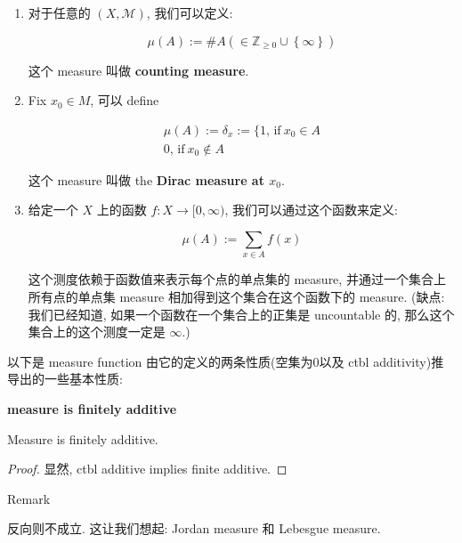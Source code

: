\documentclass{qlnotes-export}
\begin{document}
\begin{example}

\begin{enumerate}
\item
  对于任意的 \((X,\mathcal{M})\), 我们可以定义:

  \[\mu(A) := \# A( \in {\mathbb{Z}}_{\geq 0} \cup \left\{ \infty \right\})\]

  这个 measure 叫做 \textbf{counting measure}.
\item
  Fix \(x_{0} \in M\), 可以 define

  \[\begin{matrix}
  {\mu(A) := \delta_{x} := \{ 1\text{, if}\ x_{0} \in A} \\
  {0\text{, if}\ x_{0} \notin A}
  \end{matrix}\]

  这个 measure 叫做 the \textbf{Dirac measure at \(x_{0}\)}.
\item
  给定一个 \(X\) 上的函数 \(f:X\rightarrow\lbrack 0,\infty)\), 我们可以通过这个函数来定义:

  \[\mu(A) := \sum\limits_{x \in A}f(x)\]

  这个测度依赖于函数值来表示每个点的单点集的 measure, 并通过一个集合上所有点的单点集 measure 相加得到这个集合在这个函数下的 measure. (缺点: 我们已经知道, 如果一个函数在一个集合上的正集是 uncountable 的, 那么这个集合上的这个测度一定是 \(\infty\).)
\end{enumerate}

\end{example}

以下是 measure function 由它的定义的两条性质(空集为0以及 ctbl additivity)推导出的一些基本性质:

\begin{lemma}{\protect{}\label{kn-measure-is-finitely-additive}{\textbf{measure
is finitely additive}}}

Measure is finitely additive.

\end{lemma}

\begin{proof}

显然, ctbl additive implies finite additive.

\end{proof}

\begin{qlremark}{Remark}

反向则不成立. 这让我们想起: Jordan measure 和 Lebesgue measure.

\end{qlremark}
\end{document}
